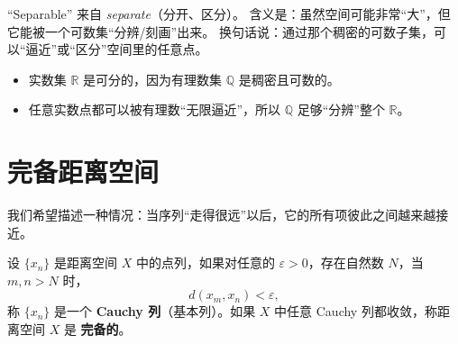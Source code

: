 \begin{remark}[词源解释]
“Separable” 来自 \textit{separate}（分开、区分）。  
含义是：虽然空间可能非常“大”，但它能被一个可数集“分辨/刻画”出来。  
换句话说：通过那个稠密的可数子集，可以“逼近”或“区分”空间里的任意点。
\end{remark}

\begin{example}
\begin{itemize}
  \item 实数集 $\mathbb{R}$ 是可分的，因为有理数集 $\mathbb{Q}$ 是稠密且可数的。
  \item 任意实数点都可以被有理数“无限逼近”，所以 $\mathbb{Q}$ 足够“分辨”整个 $\mathbb{R}$。
\end{itemize}
\end{example}

\section{完备距离空间}
我们希望描述一种情况：当序列“走得很远”以后，它的所有项彼此之间越来越接近。
\begin{definition}
设 $\{x_n\}$ 是距离空间 $X$ 中的点列，如果对任意的 $\varepsilon > 0$，存在自然数 $N$，当 $m,n > N$ 时，
\[
d(x_m, x_n) < \varepsilon,
\]
称 $\{x_n\}$ 是一个 \textbf{Cauchy 列}（基本列）。如果 $X$ 中任意 Cauchy 列都收敛，称距离空间 $X$ 是 \textbf{完备的}。
\end{definition}

